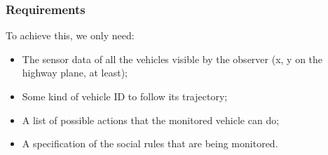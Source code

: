 \documentclass{beamer}
\begin{document}
\begin{frame}
\frametitle{Requirements}

To achieve this, we only need:
\begin{itemize}
\item The sensor data of all the vehicles visible by the observer (x, y 
      on the highway plane, at least);
\item Some kind of vehicle ID to 
      follow its trajectory;
\item A list of possible actions that the monitored vehicle can do;
\item A specification of the social rules that are being monitored.
\end{itemize}

\end{frame}
\end{document}
